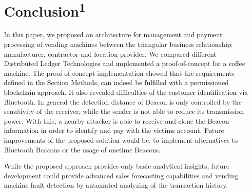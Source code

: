 \section{Conclusion\textsuperscript{1}}
In this paper, we proposed an architecture for management and payment processing of vending machines between the triangular business relationship: manufacturer, contractor and location provider. We compared different Distributed Ledger Technologies and implemented a proof-of-concept for a coffee machine. The proof-of-concept implementation showed that the requirements defined in the Section Methods, can indeed be fulfilled with a permissioned blockchain approach. It also revealed difficulties of the customer identification via Bluetooth. In general the detection distance of Beacon is only controlled by the sensitivity of the receiver, while the sender is not able to reduce its transmission power. With this, a nearby attacker is able to receive and clone the Beacon information in order to identify and pay with the victims account. Future improvements of the proposed solution would be, to implement alternatives to Bluetooth Beacons or the usage of onetime Beacons.  

While the proposed approach provides only basic analytical insights, future development could provide advanced sales forecasting capabilities and vending machine fault detection by automated analyzing of the transaction history.